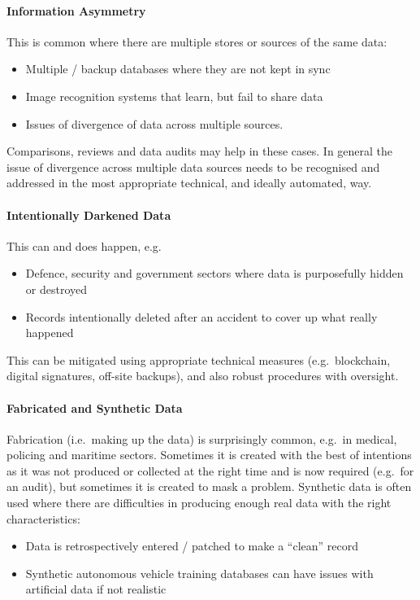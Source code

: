 \paragraph{Information Asymmetry}\label{bkm:dark12}
This is common where there are multiple stores or sources of the same data:
\begin{itemize}
\item Multiple / backup \glspl{database} where they are not kept in sync
  \item Image recognition systems that learn, but fail to share data
  \item Issues of divergence of data across multiple sources.
\end{itemize}

Comparisons, reviews and data audits may help in these cases. In general the issue of divergence across multiple data sources needs to be recognised and addressed in the most appropriate technical, and ideally automated, way.

\paragraph{Intentionally Darkened Data}\label{bkm:dark13}
This can and does happen, e.g.
\begin{itemize}
\item Defence, security and government sectors where data is purposefully hidden or destroyed
  \item Records intentionally deleted after an accident to cover up what really happened
\end{itemize}

This can be mitigated using appropriate technical measures (e.g.\ blockchain, digital signatures, off-site backups), and also robust procedures with oversight.

\paragraph{Fabricated and Synthetic Data}\label{bkm:dark14}
Fabrication (i.e.\ making up the data) is surprisingly common, e.g.\ in medical, policing and maritime sectors. Sometimes it is created with the best of intentions as it was not produced or collected at the right time and is now required (e.g.\ for an audit), but sometimes it is created to mask a problem. Synthetic data is often used where there are difficulties in producing enough real data with the right characteristics:
\begin{itemize}
\item Data is retrospectively entered / patched to make a “clean” record
  \item Synthetic autonomous vehicle training \glspl{database} can have issues with artificial data if not realistic
\end{itemize}

